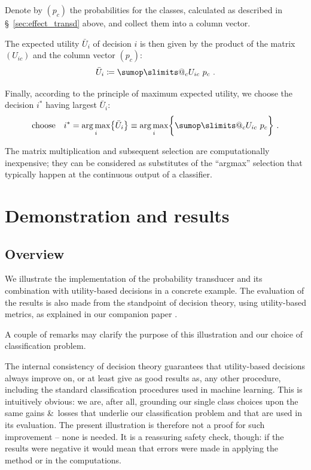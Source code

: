 \documentclass[\ifafour a4paper,12pt,\else a5paper,10pt,\fi%
onecolumn,oneside,article,%
british%
]{memoir}
\makeatletter
\theoremstyle{remark}
\theoremstyle{innote}
\def\sum{\DOTSI\sumop\slimits@}
\newcommand*{\amp}{\&}
\newcommand*{\defd}{\coloneqq}
\DeclarePairedDelimiter\set{\{}{\}} %
\renewcommand*{\|}[1][]{\nonscript\:#1\vert\nonscript\:\mathopen{}}
\newcommand*{\sect}{\S}%
\DeclareMathOperator*{\argmax}{arg\,max}
\newcommand*{\eu}{\bar{U}}
\makeatother
\begin{document}
Denote by $(p_{c})$ the probabilities for the classes, calculated as described in \sect~\ref{sec:effect_transd} above, and collect them into a column vector.

The expected utility $\eu_{i}$ of decision $i$ is then given by the product of the matrix $(U_{ic})$ and the column vector $(p_{c})$:
\begin{equation}
  \label{eq:expe_utilities}
  \eu_{i} \defd \sum_{c} U_{ic}\ p_{c} \ .
\end{equation}

Finally, according to the principle of maximum expected utility, we choose the decision $i^{*}$ having largest $\eu_{i}$:
\begin{equation}
  \label{eq:max_expe_utility}
  \text{choose}\quad
  i^{*} = \argmax_{i}\set*{\eu_{i}} \equiv \argmax_{i}\set[\bigg]{\sum_{c} U_{ic}\ p_{c}} \ .
\end{equation}

The matrix multiplication and subsequent selection are computationally inexpensive; they can be considered as substitutes of the \enquote{argmax} selection that typically happen at the continuous output of a classifier.

\section{Demonstration and results}
\label{sec:demonstration}

\subsection{Overview}
\label{sec:demo_overview}

We illustrate the implementation of the probability transducer and its combination with utility-based decisions in a concrete example. The evaluation of the results is also made from the standpoint of decision theory, using utility-based metrics, as explained in our companion paper \autocites{dyrlandetal2022}.

A couple of remarks may clarify the purpose of this illustration and our choice of classification problem.

The internal consistency of decision theory guarantees that utility-based decisions always improve on, or at least give as good results as, any other procedure, including the standard classification procedures used in machine learning. This is intuitively obvious: we are, after all, grounding our single class choices upon the same gains \amp\ losses that underlie our classification problem and that are used in its evaluation. The present illustration is therefore not a proof for such improvement -- none is needed. It is a reassuring safety check, though: if the results were negative it would mean that errors were made in applying the method or in the computations.
\end{document}
